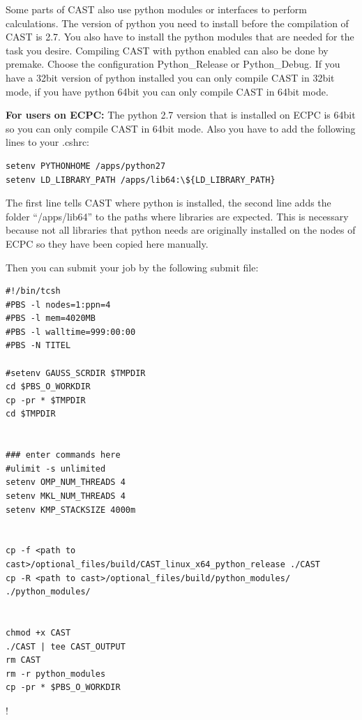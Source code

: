 \documentclass[10pt,a4paper]{article} %
\begin{document}
	Some parts of \ac{CAST} also use python modules or interfaces to perform calculations. The version of python you need to install before the compilation of CAST is 2.7. You also have to install the python modules that are needed for the task you desire. Compiling CAST with python enabled can also be done by premake. Choose the configuration Python\_Release or Python\_Debug. If you have a 32bit version of python installed you can only compile \ac{CAST} in 32bit mode, if you have python 64bit you can only compile \ac{CAST} in 64bit mode. 
	
	\textbf{For users on ECPC:} The python 2.7 version that is installed on ECPC is 64bit so you can only compile \ac{CAST} in 64bit mode. Also you have to add the following lines to your .cshrc:
\begin{lstlisting}
setenv PYTHONHOME /apps/python27
setenv LD_LIBRARY_PATH /apps/lib64:\${LD_LIBRARY_PATH}
\end{lstlisting}	
The first line tells CAST where python is installed, the second line adds the folder ``/apps/lib64'' to the paths where libraries are expected. This is necessary because not all libraries that python needs are originally installed on the nodes of ECPC so they have been copied here manually. 

Then you can submit your job by the following submit file:
\begin{lstlisting}
#!/bin/tcsh                                                                                    
#PBS -l nodes=1:ppn=4                                                                          
#PBS -l mem=4020MB
#PBS -l walltime=999:00:00
#PBS -N TITEL

#setenv GAUSS_SCRDIR $TMPDIR
cd $PBS_O_WORKDIR
cp -pr * $TMPDIR
cd $TMPDIR


### enter commands here
#ulimit -s unlimited
setenv OMP_NUM_THREADS 4
setenv MKL_NUM_THREADS 4
setenv KMP_STACKSIZE 4000m


cp -f <path to cast>/optional_files/build/CAST_linux_x64_python_release ./CAST
cp -R <path to cast>/optional_files/build/python_modules/ ./python_modules/


chmod +x CAST
./CAST | tee CAST_OUTPUT
rm CAST
rm -r python_modules
cp -pr * $PBS_O_WORKDIR   
\end{lstlisting}	
\ifx{\verb+$+}!\fi  %

	
	\newpage
\end{document}
